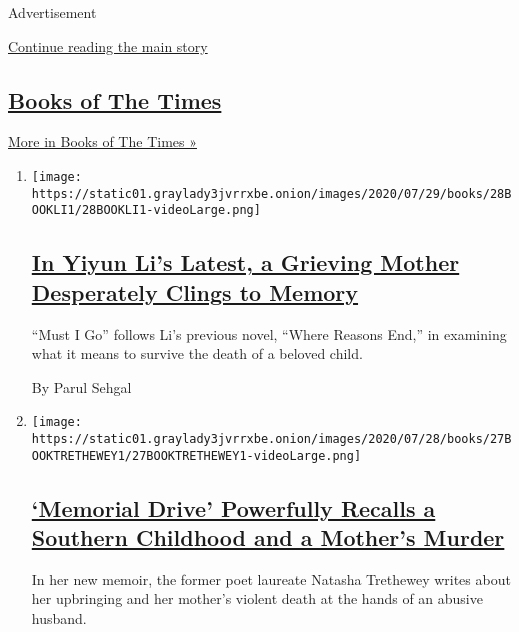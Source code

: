 Advertisement

\protect\hyperlink{after-mid1}{Continue reading the main story}

\hypertarget{books-of-the-times-2}{%
\subsection{\texorpdfstring{\href{/column/books-of-the-times}{Books of
The Times}}{Books of The Times}}\label{books-of-the-times-2}}

\href{/column/books-of-the-times}{More in Books of The Times »}

\begin{enumerate}
\def\labelenumi{\arabic{enumi}.}
\item
  \texttt{[image: https://static01.graylady3jvrrxbe.onion/images/2020/07/29/books/28BOOKLI1/28BOOKLI1-videoLarge.png]}

  \hypertarget{in-yiyun-lis-latest-a-grieving-mother-desperately-clings-to-memory}{%
  \subsection{\texorpdfstring{\href{/2020/07/28/books/review-must-i-go-yiyun-li.html}{In
  Yiyun Li's Latest, a Grieving Mother Desperately Clings to
  Memory}}{In Yiyun Li's Latest, a Grieving Mother Desperately Clings to Memory}}\label{in-yiyun-lis-latest-a-grieving-mother-desperately-clings-to-memory}}

  ``Must I Go'' follows Li's previous novel, ``Where Reasons End,'' in
  examining what it means to survive the death of a beloved child.

  By Parul Sehgal
\item
  \texttt{[image: https://static01.graylady3jvrrxbe.onion/images/2020/07/28/books/27BOOKTRETHEWEY1/27BOOKTRETHEWEY1-videoLarge.png]}

  \hypertarget{memorial-drive-powerfully-recalls-a-southern-childhood-and-a-mothers-murder}{%
  \subsection{\texorpdfstring{\href{/2020/07/27/books/review-memorial-drive-memoir-natasha-trethewey.html}{`Memorial
  Drive' Powerfully Recalls a Southern Childhood and a Mother's
  Murder}}{`Memorial Drive' Powerfully Recalls a Southern Childhood and a Mother's Murder}}\label{memorial-drive-powerfully-recalls-a-southern-childhood-and-a-mothers-murder}}

  In her new memoir, the former poet laureate Natasha Trethewey writes
  about her upbringing and her mother's violent death at the hands of an
  abusive husband.


\end{enumerate}
